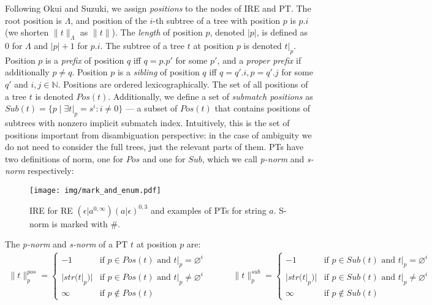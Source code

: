 \documentclass[AMA,STIX1COL]{WileyNJD-v2}
\newcommand{\XP}{\mathcal{P}}
\newcommand{\YN}{\mathbb{N}}
\newcommand{\pnorm}[2]{\|{#1}\|^{pos}_{#2}}
\newcommand{\snorm}[2]{\|{#1}\|^{sub}_{#2}}
\begin{document}
Following Okui and Suzuki, we assign \emph{positions} to the nodes of IRE and PT.
The root position is $\Lambda$, and position of the $i$-th subtree of a tree with position $p$ is $p.i$
(we shorten $\|t\|_\Lambda$ as $\|t\|$).
The \emph{length} of position $p$, denoted $|p|$, is defined as $0$ for $\Lambda$ and $|p| + 1$ for $p.i$.
The subtree of a tree $t$ at position $p$ is denoted $t|_p$.
Position $p$ is a \emph{prefix} of position $q$ iff $q = p.p'$ for some $p'$,
and a \emph{proper prefix} if additionally $p \neq q$.
Position $p$ is a \emph{sibling} of position $q$ iff $q = q'.i, p = q'.j$ for some $q'$ and $i,j \in \YN$.
Positions are ordered lexicographically.
The set of all positions of a tree $t$ is denoted $Pos(t)$.
Additionally, we define a set of \emph{submatch positions} as
$Sub(t) = \big\{ p \mid \exists t|_p = s^i : i \neq 0 \big\}$ ---
a subset of $Pos(t)$ that contains positions of subtrees with nonzero implicit submatch index.
Intuitively, this is the set of positions important from disambiguation perspective:
in the case of ambiguity we do not need to consider the full trees,
just the relevant parts of them.
%
PTs have two definitions of norm, one for $Pos$ and one for $Sub$,
which we call \emph{p-norm} and \emph{s-norm} respectively:

\begin{figure}
\texttt{[image: img/mark\_and\_enum.pdf]}
\vspace{-2em}
\caption{
IRE for RE $(\epsilon|a^{0,\infty})(a|\epsilon)^{0,3}$
and examples of PTs for string $a$.
S-norm is marked with $\#$.
}\label{fig:mark_and_enum}
\end{figure}

    \begin{definition}\label{tnorm_of_PTs}
    The \emph{p-norm} and \emph{s-norm} of a PT $t$ at position $p$ are:
    \begin{align*}
        \pnorm{t}{p} =
            \begin{cases}
                -1          &\text{if } p \in Pos(t) \text{ and } t|_p = \varnothing^i  \\[-0.2em]
                |str(t|_p)| &\text{if } p \in Pos(t) \text{ and } t|_p \neq \varnothing^i \\[-0.2em]
                \infty      &\text{if } p \not\in Pos(t)
            \end{cases}
    \quad\quad\quad
        \snorm{t}{p} =
            \begin{cases}
                -1          &\text{if } p \in Sub(t) \text{ and } t|_p = \varnothing^i  \\[-0.2em]
                |str(t|_p)| &\text{if } p \in Sub(t) \text{ and } t|_p \neq \varnothing^i \\[-0.2em]
                \infty      &\text{if } p \not\in Sub(t)
            \end{cases}
    \end{align*}
    \end{definition}
\end{document}
